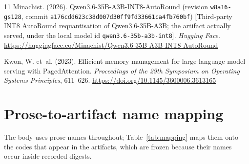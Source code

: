 \documentclass{article}
\begin{document}
\begin{thebibliography}{11}
Minachist. (2026). Qwen3.6-35B-A3B-INT8-AutoRound (revision
\texttt{w8a16-gs128}, commit
\texttt{a176cdd623c38d007d30ff9fd33661ca4fb760bf}) [Third-party INT8 AutoRound
requantisation of Qwen3.6-35B-A3B; the artifact actually served, under the local
model id \texttt{qwen3.6-35b-a3b-int8}]. \emph{Hugging Face}.
\url{https://huggingface.co/Minachist/Qwen3.6-35B-A3B-INT8-AutoRound}

Kwon, W. et~al. (2023). Efficient memory management for large language model
serving with PagedAttention. \emph{Proceedings of the 29th Symposium on
Operating Systems Principles}, 611--626.
\url{https://doi.org/10.1145/3600006.3613165}

\end{thebibliography}

\appendix

\section{Prose-to-artifact name mapping}
\label{app:mapping}

The body uses prose names throughout; Table~\ref{tab:mapping} maps them onto the
codes that appear in the artifacts, which are frozen because their names occur
inside recorded digests.
\end{document}
